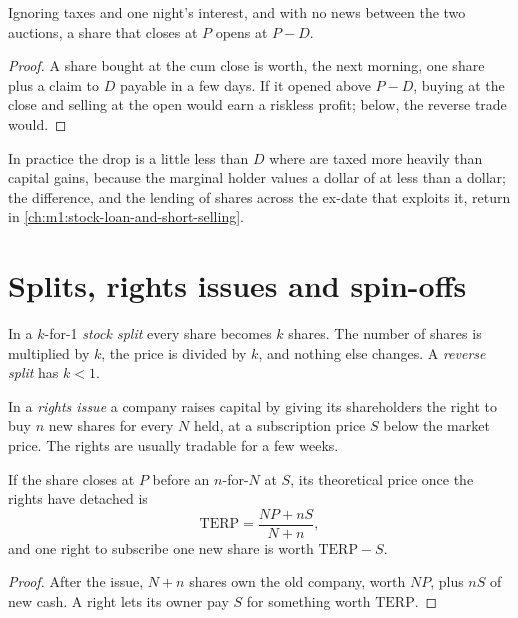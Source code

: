 \begin{proposition}\label{prop:m1:shares-corporate-actions-indices:drop}
Ignoring taxes and one night's interest, and with no news between the two
auctions, a share that closes  at $P$ opens  at $P -
D$.
\end{proposition}
\begin{proof}
A share bought at the cum close is worth, the next morning, one 
share plus a claim to $D$ payable in a few days. If it opened above $P - D$,
buying at the close and selling at the open would earn a riskless profit;
below, the reverse trade would.
\end{proof}

In practice the drop is a little less than $D$ where  are taxed more
heavily than capital gains, because the marginal holder values a dollar of
 at less than a dollar; the difference, and the lending of shares
across the ex-date that exploits it, return in
\cref{ch:m1:stock-loan-and-short-selling}.

\section{Splits, rights issues and spin-offs}

\begin{definition}\label{def:m1:shares-corporate-actions-indices:split}
In a $k$-for-1 \emph{stock split} every share becomes $k$
shares. The number of shares is multiplied by $k$, the price is divided by
$k$, and nothing else changes. A \emph{reverse split} has $k<1$.
\end{definition}

\begin{definition}\label{def:m1:shares-corporate-actions-indices:rights}
In a \emph{rights issue} a company raises capital by
giving its shareholders the right to buy $n$ new shares for every $N$ held,
at a subscription price $S$ below the market price. The rights are usually
tradable for a few weeks.
\end{definition}

\begin{proposition}\label{prop:m1:shares-corporate-actions-indices:terp}
If the share closes at $P$ before an $n$-for-$N$  at $S$, its
theoretical price once the rights have detached is
\[
\mathrm{TERP} = \frac{NP + nS}{N+n},
\]
and one right to subscribe one new share is worth $\mathrm{TERP} - S$.
\end{proposition}
\begin{proof}
After the issue, $N+n$ shares own the old company, worth $NP$, plus $nS$ of
new cash. A right lets its owner pay $S$ for something worth
$\mathrm{TERP}$.
\end{proof}

